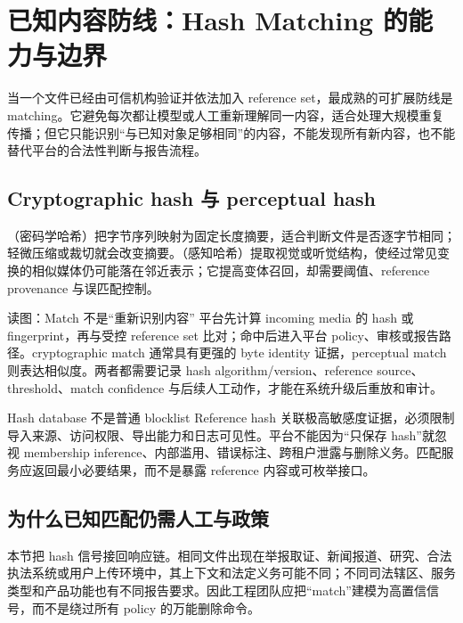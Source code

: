 \section{已知内容防线：Hash Matching 的能力与边界}

当一个文件已经由可信机构验证并依法加入 reference set，最成熟的可扩展防线是 matching。它避免每次都让模型或人工重新理解同一内容，适合处理大规模重复传播；但它只能识别“与已知对象足够相同”的内容，不能发现所有新内容，也不能替代平台的合法性判断与报告流程。

\subsection{Cryptographic hash 与 perceptual hash}

（密码学哈希）把字节序列映射为固定长度摘要，适合判断文件是否逐字节相同；轻微压缩或裁切就会改变摘要。（感知哈希）提取视觉或听觉结构，使经过常见变换的相似媒体仍可能落在邻近表示；它提高变体召回，却需要阈值、reference provenance 与误匹配控制。


\begin{knowledgebox}{读图：Match 不是“重新识别内容”}
平台先计算 incoming media 的 hash 或 fingerprint，再与受控 reference set 比对；命中后进入平台 policy、审核或报告路径。cryptographic match 通常具有更强的 byte identity 证据，perceptual match 则表达相似度。两者都需要记录 hash algorithm/version、reference source、threshold、match confidence 与后续人工动作，才能在系统升级后重放和审计。
\end{knowledgebox}

\begin{warningbox}{Hash database 不是普通 blocklist}
Reference hash 关联极高敏感度证据，必须限制导入来源、访问权限、导出能力和日志可见性。平台不能因为“只保存 hash”就忽视 membership inference、内部滥用、错误标注、跨租户泄露与删除义务。匹配服务应返回最小必要结果，而不是暴露 reference 内容或可枚举接口。
\end{warningbox}

\subsection{为什么已知匹配仍需人工与政策}

本节把 hash 信号接回响应链。相同文件出现在举报取证、新闻报道、研究、合法执法系统或用户上传环境中，其上下文和法定义务可能不同；不同司法辖区、服务类型和产品功能也有不同报告要求。因此工程团队应把“match”建模为高置信信号，而不是绕过所有 policy 的万能删除命令。


